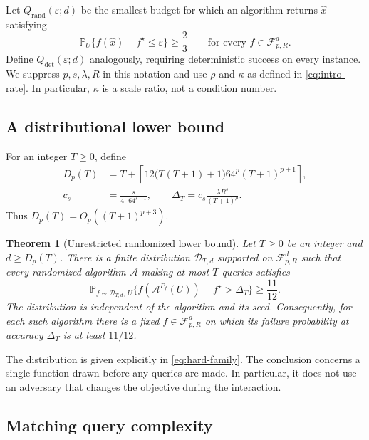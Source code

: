 \documentclass[11pt]{article}
\newtheorem{theorem}{Theorem}[section]
\theoremstyle{definition}
\theoremstyle{remark}
\newcommand{\PP}{\mathbb P}
\newcommand{\eps}{\varepsilon}
\newcommand{\F}{\mathcal F}
\newcommand{\D}{\mathcal D}
\newcommand{\Qrand}{Q_{\mathrm{rand}}}
\newcommand{\Qdet}{Q_{\mathrm{det}}}
\begin{document}
Let $\Qrand(\eps;d)$ be the smallest budget for which an algorithm
returns $\widehat x$ satisfying
\begin{equation}\label{eq:success}
\PP_U\{f(\widehat x)-f^\star\le\eps\}\ge\frac23
\qquad\text{for every }f\in\F_{p,R}^{d}.
\end{equation}
Define $\Qdet(\eps;d)$ analogously, requiring deterministic success on
every instance. We suppress $p,s,\lambda,R$ in this notation and use
$\rho$ and $\kappa$ as defined in \eqref{eq:intro-rate}. In particular,
$\kappa$ is a scale ratio, not a condition number.

\subsection{A distributional lower bound}

For an integer $T\ge0$, define
\begin{equation}\label{eq:dimension-T}
\begin{split}
D_p(T)
&=T+\left\lceil
12\bigl(T(T+1)+1\bigr)64^p(T+1)^{p+1}
\right\rceil,\\
c_s&=\frac{s}{4\cdot64^{s-1}},
\qquad
\Delta_T=c_s\frac{\lambda R^s}{(T+1)^\rho}.
\end{split}
\end{equation}
Thus $D_p(T)=O_p((T+1)^{p+3})$.

\begin{theorem}[Unrestricted randomized lower bound]\label{thm:budget}
Let $T\ge0$ be an integer and $d\ge D_p(T)$. There is a finite
distribution $\D_{T,d}$ supported on $\F_{p,R}^{d}$ such that every
randomized algorithm $\mathcal A$ making at most $T$ queries satisfies
\begin{equation}\label{eq:distributional}
\PP_{f\sim\D_{T,d},\,U}
\bigl\{f(\mathcal A^{P_f}(U))-f^\star>\Delta_T\bigr\}
\ge\frac{11}{12}.
\end{equation}
The distribution is independent of the algorithm and its seed.
Consequently, for each such algorithm there is a fixed
$f\in\F_{p,R}^{d}$ on which its failure probability at accuracy
$\Delta_T$ is at least $11/12$.
\end{theorem}

The distribution is given explicitly in \eqref{eq:hard-family}.
The conclusion concerns a single function drawn before any queries are
made. In particular, it does not use an adversary that changes the
objective during the interaction.

\subsection{Matching query complexity}
\end{document}
